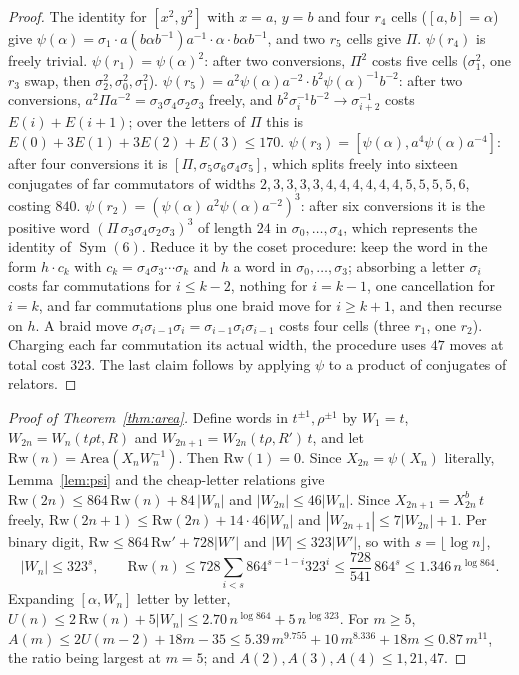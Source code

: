 \documentclass[11pt,a4paper]{article}
\theoremstyle{plain}
\theoremstyle{definition}
\theoremstyle{remark}
\DeclareMathOperator{\Sym}{Sym}
\begin{document}
\begin{proof}
The identity for $[x^2,y^2]$ with $x=a$, $y=b$ and four $r_4$ cells ($[a,b]=\alpha$) give
$\psi(\alpha)=\sigma_1\cdot a(b\alpha b^{-1})a^{-1}\cdot\alpha\cdot b\alpha b^{-1}$, and two $r_5$ cells give $\Pi$. $\psi(r_4)$ is freely trivial.
$\psi(r_1)=\psi(\alpha)^2$: after two conversions, $\Pi^2$ costs five cells ($\sigma_1^2$, one $r_3$ swap, then $\sigma_2^2,\sigma_0^2,\sigma_1^2$).
$\psi(r_5)=a^2\psi(\alpha)a^{-2}\cdot b^2\psi(\alpha)^{-1}b^{-2}$: after two conversions, $a^2\Pi a^{-2}=\sigma_3\sigma_4\sigma_2\sigma_3$ freely, and
$b^2\sigma_i^{-1}b^{-2}\to\sigma_{i+2}^{-1}$ costs $E(i)+E(i+1)$; over the letters of $\Pi$ this is $E(0)+3E(1)+3E(2)+E(3)\le170$.
$\psi(r_3)=[\psi(\alpha),a^4\psi(\alpha)a^{-4}]$: after four conversions it is $[\Pi,\sigma_5\sigma_6\sigma_4\sigma_5]$, which splits freely into
sixteen conjugates of far commutators of widths $2,3,3,3,3,4,4,4,4,4,4,5,5,5,5,6$, costing $840$. $\psi(r_2)=(\psi(\alpha)\,a^2\psi(\alpha)a^{-2})^3$:
after six conversions it is the positive word $(\Pi\,\sigma_3\sigma_4\sigma_2\sigma_3)^3$ of length $24$ in $\sigma_0,\dots,\sigma_4$, which
represents the identity of $\Sym(6)$. Reduce it by the coset procedure: keep the word in the form $h\cdot c_k$ with
$c_k=\sigma_4\sigma_3\cdots\sigma_k$ and $h$ a word in $\sigma_0,\dots,\sigma_3$; absorbing a letter $\sigma_i$ costs far commutations for
$i\le k-2$, nothing for $i=k-1$, one cancellation for $i=k$, and far commutations plus one braid move for $i\ge k+1$, and then
recurse on $h$. A braid move $\sigma_i\sigma_{i-1}\sigma_i=\sigma_{i-1}\sigma_i\sigma_{i-1}$ costs four cells (three $r_1$, one $r_2$). Charging each
far commutation its actual width, the procedure uses $47$ moves at total cost $323$. The last claim follows by applying
$\psi$ to a product of conjugates of relators.
\end{proof}

\begin{proof}[Proof of Theorem~\ref{thm:area}]
Define words in $t^{\pm1},\rho^{\pm1}$ by $W_1=t$, $W_{2n}=W_n(t\rho t,R)$ and $W_{2n+1}=W_{2n}(t\rho,R')\,t$, and let
$\mathrm{Rw}(n)=\mathrm{Area}(X_nW_n^{-1})$. Then $\mathrm{Rw}(1)=0$. Since $X_{2n}=\psi(X_n)$ literally, Lemma~\ref{lem:psi} and the
cheap-letter relations give $\mathrm{Rw}(2n)\le864\,\mathrm{Rw}(n)+84\,|W_n|$ and $|W_{2n}|\le46|W_n|$. Since
$X_{2n+1}=X_{2n}^b\,t$ freely, $\mathrm{Rw}(2n+1)\le\mathrm{Rw}(2n)+14\cdot46|W_n|$ and $|W_{2n+1}|\le7|W_{2n}|+1$. Per binary digit,
$\mathrm{Rw}\le864\,\mathrm{Rw}'+728|W'|$ and $|W|\le323|W'|$, so with $s=\lfloor\log n\rfloor$,
\[
|W_n|\le323^s,\qquad \mathrm{Rw}(n)\le728\sum_{i<s}864^{s-1-i}323^i\le\frac{728}{541}\,864^s\le1.346\,n^{\log864}.
\]
Expanding $[\alpha,W_n]$ letter by letter, $U(n)\le2\,\mathrm{Rw}(n)+5|W_n|\le2.70\,n^{\log864}+5\,n^{\log323}$. For $m\ge5$,
$A(m)\le2U(m-2)+18m-35\le5.39\,m^{9.755}+10\,m^{8.336}+18m\le0.87\,m^{11}$, the ratio being largest at $m=5$; and
$A(2),A(3),A(4)\le1,21,47$.
\end{proof}
\end{document}
